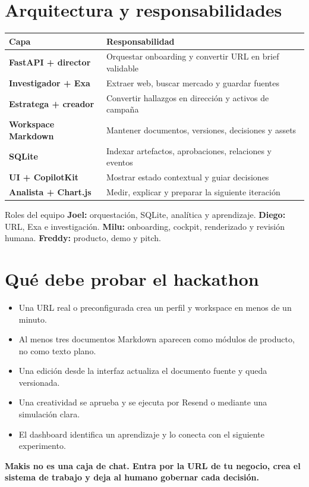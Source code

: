 \documentclass{loopmind-doc}
\begin{document}
\section{Arquitectura y responsabilidades}

\begin{tabularx}{\textwidth}{>{\bfseries}p{46mm}X}
\toprule
\textbf{Capa} & \textbf{Responsabilidad} \\
\midrule
FastAPI + director & Orquestar onboarding y convertir URL en brief validable \\
Investigador + Exa & Extraer web, buscar mercado y guardar fuentes \\
Estratega + creador & Convertir hallazgos en dirección y activos de campaña \\
Workspace Markdown & Mantener documentos, versiones, decisiones y assets \\
SQLite & Indexar artefactos, aprobaciones, relaciones y eventos \\
UI + CopilotKit & Mostrar estado contextual y guiar decisiones \\
Analista + Chart.js & Medir, explicar y preparar la siguiente iteración \\
\bottomrule
\end{tabularx}

\vspace{12pt}
\begin{callouttitled}{Roles del equipo}
\textbf{Joel:} orquestación, SQLite, analítica y aprendizaje. \quad
\textbf{Diego:} URL, Exa e investigación. \quad
\textbf{Milu:} onboarding, cockpit, renderizado y revisión humana. \quad
\textbf{Freddy:} producto, demo y pitch.
\end{callouttitled}

\section{Qué debe probar el hackathon}

\begin{callout}
\begin{itemize}
  \item Una URL real o preconfigurada crea un perfil y workspace en menos de un minuto.
  \item Al menos tres documentos Markdown aparecen como módulos de producto, no como texto plano.
  \item Una edición desde la interfaz actualiza el documento fuente y queda versionada.
  \item Una creatividad se aprueba y se ejecuta por Resend o mediante una simulación clara.
  \item El dashboard identifica un aprendizaje y lo conecta con el siguiente experimento.
\end{itemize}
\end{callout}

\begin{tcolorbox}[colback=lm-black,colframe=lm-black,arc=2mm,left=7mm,right=7mm,top=7mm,bottom=7mm]
{\headingfont\bfseries\fontsize{16pt}{22pt}\selectfont\color{white}
Makis no es una caja de chat. Entra por la URL de tu negocio, crea el sistema de trabajo y deja al humano gobernar cada decisión.}
\end{tcolorbox}
\end{document}
